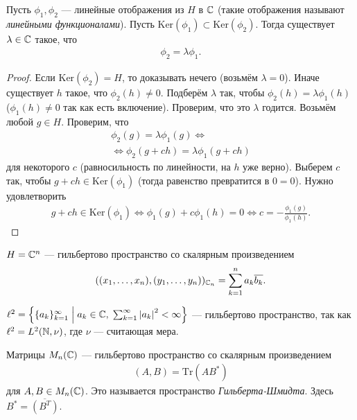 \begin{lm}
\label{lemma:kernel_of_functional}
Пусть $\phi_1, \phi_2$ --- линейные отображения из $H$ в $\mathbb{C}$ (такие отображения называют \textit{линейными функционалами}). Пусть  $\mathrm{Ker}(\phi_1) \subset \mathrm{Ker}(\phi_2)$. Тогда существует $\lambda \in \mathbb{C}$ такое, что \begin{align*}
 \phi_2 = \lambda \phi_1
.\end{align*} 
\end{lm}
\begin{proof}
 Если  $\mathrm{Ker}(\phi_2) = H$, то доказывать нечего (возьмём $\lambda = 0$). Иначе существует $h$ такое, что $\phi_2(h) \neq 0$. Подберём $\lambda$ так, чтобы $\phi_2(h) = \lambda \phi_1(h)$ ($\phi_1(h) \neq 0$ так как есть включение). Проверим, что это $\lambda$ годится. Возьмём любой $g \in H$. Проверим, что 
\begin{align*}
\phi_2(g) = \lambda \phi_1(g) \iff \\
\iff \phi_2(g + ch) = \lambda \phi_1(g + ch)
\end{align*} для некоторого $c$ (равносильность по линейности, на $h$ уже верно). Выберем $c$ так, чтобы $g + ch \in \mathrm{Ker}(\phi_1)$ (тогда равенство превратится в $0 = 0$). Нужно удовлетворить \begin{align*}
g + ch \in \mathrm{Ker}(\phi_1) \iff \phi_1(g) + c\phi_1(h) = 0 \iff c = -\frac{\phi_1(g)}{\phi_1(h)}
.\end{align*} 
\end{proof}
\begin{exmpl}
 $H = \mathbb{C}^{n}$ --- гильбертово пространство со скалярным произведением \begin{align*}
  ((x_1, \ldots, x_n), (y_1, \ldots, y_n))_{\mathbb{C}_n} = \sum_{k=1}^{n} a_k \overline{b_k}
 .\end{align*} 
\end{exmpl}
\begin{exmpl}
 $\ell^{2} = \left\{ \{a_{k}\}_{k=1}^{\infty} \;\middle|\; a_k \in \mathbb{C},\; \sum_{k=1}^{\infty} \left| a_k \right|^{2} < \infty \right\}$ --- гильбертово пространство, так как $\ell^{2} = L^{2}(\mathbb{N}, \nu)$, где $\nu$ --- считающая мера.
\end{exmpl}
\begin{exmpl}
 Матрицы $M_n(\mathbb{C})$ --- гильбертово пространство со скалярным произведением \begin{align*}
  (A, B) = \mathrm{Tr}(AB^{\ast})
 \end{align*} для $A, B \in M_n(\mathbb{C})$. Это называется пространство \textit{Гильберта-Шмидта}. Здесь $B^{\ast} = \overline{(B^{T})}$.
\end{exmpl}
